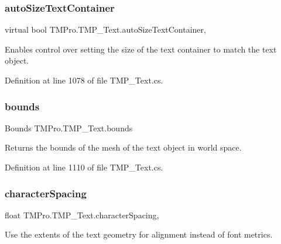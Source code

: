\subsubsection{\texorpdfstring{autoSizeTextContainer}{autoSizeTextContainer}}
{\footnotesize\ttfamily virtual bool T\+M\+Pro.\+T\+M\+P\+\_\+\+Text.\+auto\+Size\+Text\+Container\hspace{0.3cm}{\ttfamily [get]}, {\ttfamily [set]}}



Enables control over setting the size of the text container to match the text object. 



Definition at line 1078 of file T\+M\+P\+\_\+\+Text.\+cs.

\mbox{\label{class_t_m_pro_1_1_t_m_p___text_af0cdaefdde3de248088f343cce0728c1}} 
\subsubsection{\texorpdfstring{bounds}{bounds}}
{\footnotesize\ttfamily Bounds T\+M\+Pro.\+T\+M\+P\+\_\+\+Text.\+bounds\hspace{0.3cm}{\ttfamily [get]}}



Returns the bounds of the mesh of the text object in world space. 



Definition at line 1110 of file T\+M\+P\+\_\+\+Text.\+cs.

\mbox{\label{class_t_m_pro_1_1_t_m_p___text_a4f58b974821506bd6443e8771306eaf1}} 
\subsubsection{\texorpdfstring{characterSpacing}{characterSpacing}}
{\footnotesize\ttfamily float T\+M\+Pro.\+T\+M\+P\+\_\+\+Text.\+character\+Spacing\hspace{0.3cm}{\ttfamily [get]}, {\ttfamily [set]}}



Use the extents of the text geometry for alignment instead of font metrics. 

